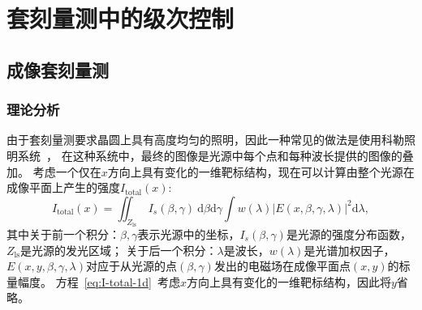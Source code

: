 \appendix
\setcounter{equation}{0}
\renewcommand{\theequation}{A.{\arabic{equation}}}
\setcounter{figure}{0}
\renewcommand{\thefigure}{A{\arabic{figure}}}

\section{套刻量测中的级次控制~\label{套刻量测中的级次控制}}

\subsection{成像套刻量测~\label{成像套刻量测}}
\subsubsection{理论分析~\label{理论分析}}
由于套刻量测要求晶圆上具有高度均匀的照明，因此一种常见的做法是使用科勒照明系统~\cite{sohn2006kohler}，
在这种系统中，最终的图像是光源中每个点和每种波长提供的图像的叠加。
考虑一个仅在$x$方向上具有变化的一维靶标结构，现在可以计算由整个光源在成像平面上产生的强度$I_\text{total}(x)$:
\begin{equation}\label{eq:I-total-1d}
I_\text{total}(x) =
\iint_{Z_\text{ls}}~I_s(\beta,\gamma)~\text{d}\beta\text{d}\gamma
\int w(\lambda) \left|E(x,\beta,\gamma,\lambda)\right|^2 \text{d}\lambda,
\end{equation}
其中关于前一个积分：$\beta,\gamma$表示光源中的坐标，$I_s(\beta,\gamma)$是光源的强度分布函数，$Z_\text{ls}$是光源的发光区域；
关于后一个积分：$\lambda$是波长，$w(\lambda)$是光谱加权因子，$E(x,y,\beta,\gamma,\lambda)$对应于从光源的点$(\beta,\gamma)$发出的电磁场在成像平面点$(x,y)$的标量幅度。
方程~\eqref{eq:I-total-1d}~考虑$x$方向上具有变化的一维靶标结构，因此将$y$省略。

